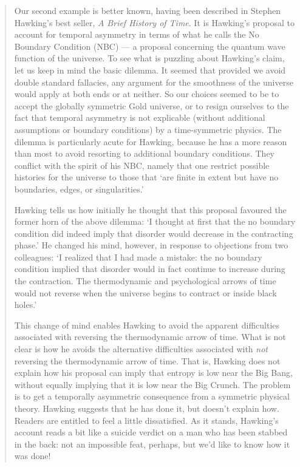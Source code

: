 \documentclass[12pt]{article}
\begin{document}
\begin{quote}
Our second example is better known, having been described in Stephen
Hawking's best seller, \emph{A Brief History of Time}. It is Hawking's proposal
to account for temporal asymmetry in terms of what he calls the No
Boundary Condition (NBC) --- a proposal concerning the quantum wave
function of the universe. To see what is puzzling about Hawking's claim,
let us keep in mind the basic dilemma. It seemed that provided we avoid
double standard fallacies, any argument for the smoothness of the
universe would apply at both ends or at neither. So our choices seemed
to be to accept the globally symmetric Gold universe, or to resign
ourselves to the fact that temporal asymmetry is not explicable (without
additional assumptions or boundary conditions) by a time-symmetric
physics. The dilemma is particularly acute for Hawking, because he has a
more reason than most to avoid resorting to additional boundary
conditions. They conflict with the spirit of his NBC, namely that one
restrict possible histories for the universe to those that `are finite
in extent but have no boundaries, edges, or singularities.'

Hawking tells us how initially he thought that this proposal favoured
the former horn of the above dilemma: `I thought at first that the no
boundary condition did indeed imply that disorder would decrease in the
contracting phase.' He changed his mind, however, in response to
objections from two colleagues: `I realized that I had made a mistake:
the no boundary condition implied that disorder would in fact continue
to increase during the contraction. The thermodynamic and psychological
arrows of time would not reverse when the universe begins to contract or
inside black holes.'

This change of mind enables Hawking to avoid the apparent difficulties
associated with reversing the thermodynamic arrow of time. What is not
clear is how he avoids the alternative difficulties associated with
\emph{not} reversing the thermodynamic arrow of time. That is, Hawking
does not explain how his proposal can imply that entropy is low near the
Big Bang, without equally implying that it is low near the Big Crunch.
The problem is to get a temporally asymmetric consequence from a
symmetric physical theory. Hawking suggests that he has done it, but
doesn't explain how. Readers are entitled to feel a little dissatisfied.
As it stands, Hawking's account reads a bit like a suicide verdict on a
man who has been stabbed in the back: not an impossible feat, perhaps,
but we'd like to know how it was done!


\end{quote}
\end{document}
